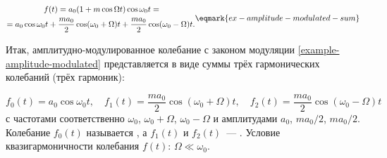 \begin{equation}
    \centering
    \begin{aligned}
        f(t)=a_0(1+m\cos\Omega t)\cos\omega_0t=&\\
=a_0\cos\omega_0t+\frac{ma_0}{2}\cos(\omega_0+\Omega)t+
\frac{ma_0}{2}\cos&(\omega_0-\Omega)t.
    \end{aligned}
    \eqmark{ex-amplitude-modulated-sum}
\end{equation}

Итак, амплитудно-модулированное колебание с законом модуляции
\eqref{example-amplitude-modulated} представляется в виде суммы трёх
гармонических
колебаний (трёх гармоник):

\begin{equation*}
    f_{0}(t)=a_0\cos\omega_0t,\quad
f_1(t)=\frac{ma_0}{2}\cos(\omega_0+\Omega)t,\quad
    f_2(t)=\frac{ma_0}{2}\cos(\omega_0-\Omega)t
\end{equation*}
с частотами соответственно $\omega_0$, $\omega_0+\Omega$, $\omega_0-\Omega$ и
амплитудами $a_0$, $ma_0/2$,
$ma_0/2$. Колебание $f_0(t)$ называется , а
$f_1(t)$ и $f_2(t)$~--- . Условие квазигармоничности колебания $f(t)$: $\Omega\ll\omega_0$.




